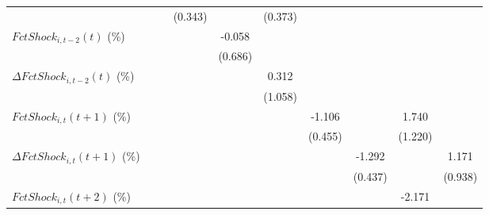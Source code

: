 {\begin{tabular}{l*{9}{c}}
                    &                     &                     &     (0.343)         &                     &     (0.373)         &                     &                     &                     &                     \\
\addlinespace
$ FctShock_{i,t-2}(t)$ (\%)&                     &                     &                     &      -0.058         &                     &                     &                     &                     &                     \\
                    &                     &                     &                     &     (0.686)         &                     &                     &                     &                     &                     \\
\addlinespace
$ \Delta FctShock_{i,t-2}(t)$ (\%)&                     &                     &                     &                     &       0.312         &                     &                     &                     &                     \\
                    &                     &                     &                     &                     &     (1.058)         &                     &                     &                     &                     \\
\addlinespace
$ FctShock_{i,t}(t+1)$ (\%)&                     &                     &                     &                     &                     &      -1.106\sym{**} &                     &       1.740         &                     \\
                    &                     &                     &                     &                     &                     &     (0.455)         &                     &     (1.220)         &                     \\
\addlinespace
$ \Delta FctShock_{i,t}(t+1)$ (\%)&                     &                     &                     &                     &                     &                     &      -1.292\sym{***}&                     &       1.171         \\
                    &                     &                     &                     &                     &                     &                     &     (0.437)         &                     &     (0.938)         \\
\addlinespace
$ FctShock_{i,t}(t+2)$ (\%)&                     &                     &                     &                     &                     &                     &                     &      -2.171\sym{**} &                     \\

\end{tabular}}
